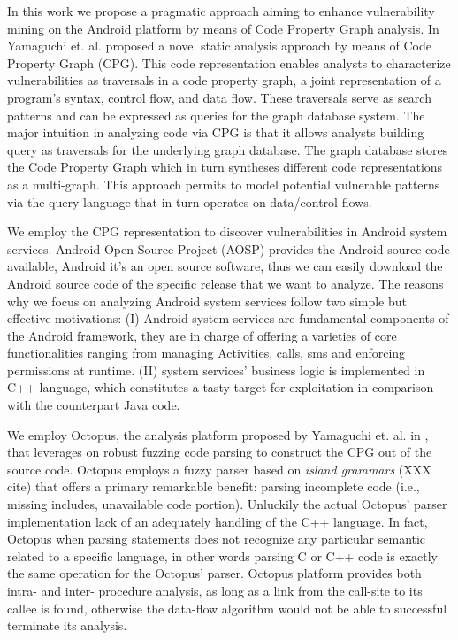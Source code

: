 In this work we propose a pragmatic approach aiming to enhance vulnerability mining on the Android platform by means of Code Property Graph analysis. In \cite{yamaguchi2014modeling,yamaguchi2015automatic,yamaguchi2011vulnerability} Yamaguchi et. al. proposed a novel static analysis approach by means of Code Property Graph (CPG). This code representation enables analysts to characterize vulnerabilities as traversals in a code property graph, a joint representation of a program’s syntax, control flow, and data flow. These traversals serve as search patterns and can be expressed as queries for the graph database system. The major intuition in analyzing code via CPG is that it allows analysts building query as traversals for the underlying graph database. The graph database stores the Code Property Graph which in turn syntheses different code representations as a multi-graph. This approach permits to model  potential vulnerable patterns via the query language that in turn operates on data/control flows. 

We employ the CPG representation to discover vulnerabilities in Android system services. Android Open Source Project (AOSP) provides the Android source code available, Android it's an open source software, thus we can easily download the Android source code of the specific release that we want to analyze.  The reasons why we focus on analyzing Android system services follow two simple but effective motivations: (I) Android system services are fundamental components of the Android framework, they are in charge of offering a varieties of core functionalities ranging from managing Activities, calls, sms and enforcing permissions at runtime. (II) system services' business logic is implemented in C++ language, which constitutes a tasty target for exploitation in comparison with the counterpart Java code.

We employ Octopus, the analysis platform proposed by Yamaguchi et. al. in \cite{yamaguchi2015pattern}, that leverages on robust fuzzing code parsing to construct the CPG out of the source code. Octopus employs a fuzzy parser based on \textit{island grammars} (XXX cite) that offers a primary remarkable benefit: parsing incomplete code (i.e., missing includes, unavailable code portion). Unluckily the actual Octopus' parser implementation lack of an adequately handling of the C++ language. In fact, Octopus when parsing statements does not recognize any particular semantic related to a specific language, in other words parsing C  or C++ code is exactly the same operation for the Octopus' parser. Octopus platform provides both intra- and inter- procedure analysis, as long as a link from the call-site to its callee is found, otherwise the data-flow algorithm would not be able to successful terminate its analysis.

